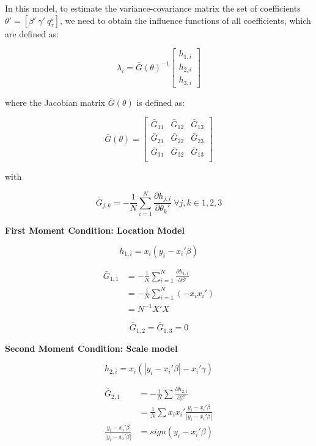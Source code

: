 \documentclass[
  authoryear,
  review,
  1p]{elsarticle}
\begin{document}
In this model, to estimate the variance-covariance matrix the set of
coefficients \(\theta'=[\beta' \ \gamma' \ q^\varepsilon_\tau]\), we
need to obtain the influence functions of all coefficients, which are
defined as:

\[\lambda_i = \bar G(\theta)^{-1}
\begin{bmatrix}
h_{1,i} \\
h_{2,i} \\
h_{3,i}
\end{bmatrix}
\]

where the Jacobian matrix \(\bar G(\theta)\) is defined as:

\[\bar G(\theta) = \begin{bmatrix}
\bar G_{11} & \bar G_{12} & \bar G_{13} \\
\bar G_{21} & \bar G_{22} & \bar G_{23} \\
\bar G_{31} & \bar G_{32} & \bar G_{13} \\
\end{bmatrix}
\]

with

\[\bar G_{j,k} = - \frac 1 N \sum_{i=1}^N \frac{\partial h_{j,i}}{\partial \theta_k'} \ \forall j,k \in 1,2,3
\]

\textbf{First Moment Condition: Location Model}

\[h_{1,i}=x_i(y_i-x_i'\beta)\]

\[\begin{aligned}
\bar G_{1,1} &=- \frac{1}{N} \sum_{i=1}^N \frac{\partial h_{1,i}}{\partial \beta'} \\
             &=- \frac{1}{N} \sum_{i=1}^N (-x_i x_i') \\
             &= N^{-1} X'X
\end{aligned}
\]

\[
\bar G_{1,2} = \bar G_{1,3} = 0
\]

\textbf{Second Moment Condition: Scale model}

\[h_{2,i}=x_i(|y_i-x_i'\beta|-x_i'\gamma)\]

\[\begin{aligned}
\bar G_{2,1} &= -\frac{1}{N} \sum \frac{\partial h_{2,i}}{\partial \beta'} \\
             &=  \frac{1}{N} \sum x_i x_i' \frac{y_i-x_i'\beta}{|y_i-x_i'\beta|} \\
\frac{y_i-x_i'\beta}{|y_i-x_i'\beta|} &= sign(y_i-x_i'\beta) \\            
\end{aligned}
\]
\end{document}
